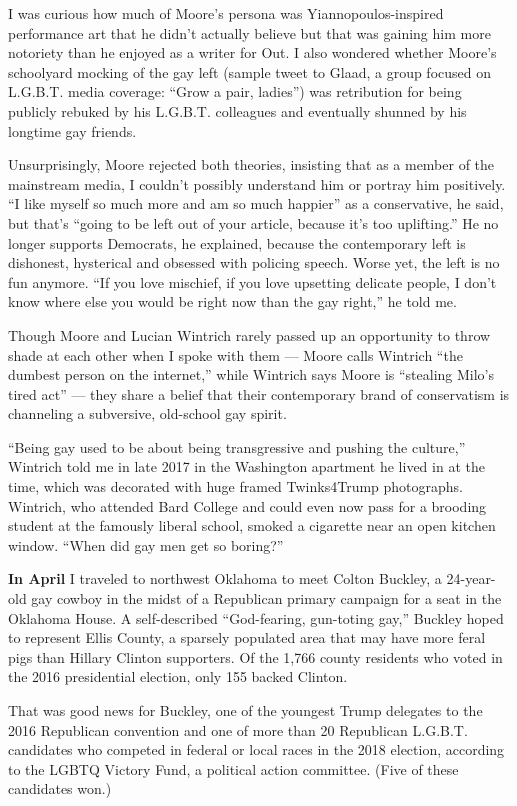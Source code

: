 I was curious how much of Moore's persona was Yiannopoulos-inspired
performance art that he didn't actually believe but that was gaining him
more notoriety than he enjoyed as a writer for Out. I also wondered
whether Moore's schoolyard mocking of the gay left (sample tweet to
Glaad, a group focused on L.G.B.T. media coverage: ``Grow a pair,
ladies'') was retribution for being publicly rebuked by his L.G.B.T.
colleagues and eventually shunned by his longtime gay friends.

Unsurprisingly, Moore rejected both theories, insisting that as a member
of the mainstream media, I couldn't possibly understand him or portray
him positively. ``I like myself so much more and am so much happier'' as
a conservative, he said, but that's ``going to be left out of your
article, because it's too uplifting.'' He no longer supports Democrats,
he explained, because the contemporary left is dishonest, hysterical and
obsessed with policing speech. Worse yet, the left is no fun anymore.
``If you love mischief, if you love upsetting delicate people, I don't
know where else you would be right now than the gay right,'' he told me.

Though Moore and Lucian Wintrich rarely passed up an opportunity to
throw shade at each other when I spoke with them --- Moore calls
Wintrich ``the dumbest person on the internet,'' while Wintrich says
Moore is ``stealing Milo's tired act'' --- they share a belief that
their contemporary brand of conservatism is channeling a subversive,
old-school gay spirit.

``Being gay used to be about being transgressive and pushing the
culture,'' Wintrich told me in late 2017 in the Washington apartment he
lived in at the time, which was decorated with huge framed Twinks4Trump
photographs. Wintrich, who attended Bard College and could even now pass
for a brooding student at the famously liberal school, smoked a
cigarette near an open kitchen window. ``When did gay men get so
boring?''

\textbf{In April} I traveled to northwest Oklahoma to meet Colton
Buckley, a 24-year-old gay cowboy in the midst of a Republican primary
campaign for a seat in the Oklahoma House. A self-described
``God-fearing, gun-toting gay,'' Buckley hoped to represent Ellis
County, a sparsely populated area that may have more feral pigs than
Hillary Clinton supporters. Of the 1,766 county residents who voted in
the 2016 presidential election, only 155 backed Clinton.

That was good news for Buckley, one of the youngest Trump delegates to
the 2016 Republican convention and one of more than 20 Republican
L.G.B.T. candidates who competed in federal or local races in the 2018
election, according to the LGBTQ Victory Fund, a political action
committee. (Five of these candidates won.)


